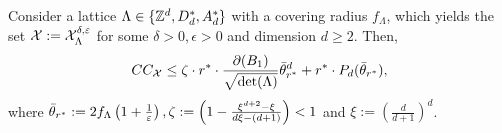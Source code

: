 \begin{thm}\label{thm:CC}
  Consider a lattice $\Lambda\in \{\mathbb{Z}^d,D_d^*,A_d^*\}$ with a covering radius $f_\Lambda$, which yields the \decomp set $\mathcal{X}:=\mathcal{X}_{\Lambda}^{\delta,\varepsilon}$ for some $\delta>0,\epsilon>0$ and dimension $d\geq 2$. %
  Then,
    \begin{align}
        CC_{\mathcal{X}}\leq \zeta \cdot r^* \cdot \frac{\partial(B_1)}{\sqrt{\det(\Lambda)}}  \Bar{\theta}_{r^*}^d + r^* \cdot P_d(\Bar{\theta}_{r^*}), \label{eq:CC_thm}
    \end{align}
    where $\Bar{\theta}_{r^*}:=2f_\Lambda\left(1+\frac{1}{\varepsilon}\right),\zeta:=\left(1 - \frac{\xi^{d+2} - \xi}{ d\xi - (d+1)}\right)<1$ and     
    $\xi:=\left(\frac{d}{d+1}\right)^d$. 
\end{thm}
